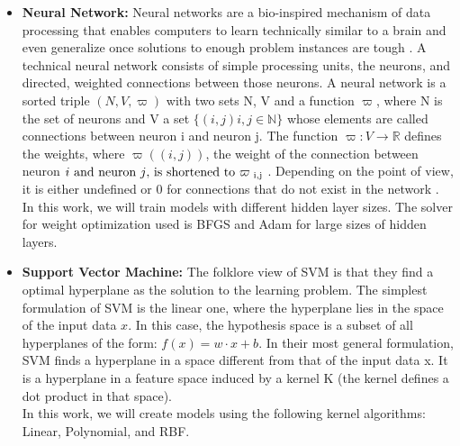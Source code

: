 \begin{itemize}
\item \textbf{Neural Network: }
Neural networks are a bio-inspired mechanism of data processing that enables computers to learn technically similar to a brain and even generalize once solutions to enough problem instances are tough \cite{Kriesel2007NeuralNetworks}. A technical neural network consists of simple processing units, the neurons, and directed, weighted connections between those neurons. A neural network is a sorted triple \((N, V, \varpi )\) with two sets N, V and a function \(\varpi\), where N is the set of neurons and V a set \(\{ (i, j) i, j \in \mathbb{N} \}\) whose elements are called connections between neuron i and neuron j. The function \( \varpi : V \rightarrow \mathbb{R}\) defines the weights, where \(\varpi((i, j))\), the weight of the connection between neuron \(i$ and neuron \(j$, is shortened to \(\varpi \textsubscript{ i,j}\) . Depending on the point of view, it is either undefined or 0 for connections that do not exist in the network \cite{Kriesel2007NeuralNetworks}. \\
In this work, we will train models with different hidden layer sizes. The solver for weight optimization used is BFGS\cite{Dai2013} and Adam\cite{adamNN} for large sizes of hidden layers.

\item \textbf{Support Vector Machine: }
The folklore view of SVM is that they find a optimal hyperplane as the solution to the learning problem. The simplest formulation of SVM is the linear one, where the hyperplane lies in the space of the input data \(x\). In this case, the hypothesis space is a subset of all hyperplanes of the form:
\(f(x) = w \cdotp x +b\).
In their most general formulation, SVM finds a hyperplane in a space different from that of the input data x. It is a hyperplane in a feature space induced by a kernel K (the kernel defines a dot product in that space)\cite{SVMEvgeniou}.\\
In this work, we will create models using the following kernel algorithms: Linear\cite{SVMTraining}, Polynomial\cite{SVMTraining}, and RBF\cite{SVMTraining}. 
\end{itemize}







